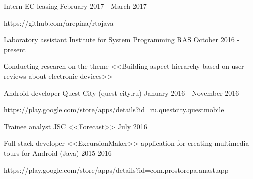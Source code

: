 



\begin{cventries}
	
\cventry
{Intern} %
{EC-leasing} %
{} %
{February 2017 - March 2017} %
{ 
	\begin{cvitems}
		\item {https://github.com/arepina/rtojava}
	\end{cvitems}
}



\cventry
{Laboratory assistant} %
{Institute for System Programming RAS} %
{} %
{October 2016 - present} %
{ 
	\begin{cvitems}
		\item {Сonducting research on the theme <<Building aspect hierarchy based on user reviews about electronic devices>>}
	\end{cvitems}
}


\cventry
{Android developer} %
{Quest City (quest-city.ru)} %
{} %
{January 2016 - November 2016} %
{ %
  \begin{cvitems}
\item {https://play.google.com/store/apps/details?id=ru.questcity.questmobile}
 \end{cvitems}
}


\cventrynodescription
{Trainee analyst } %
{JSC <<Forecast>>} %
{} %
{July 2016} %



\cventry
{Full-stack developer} %
{<<ExcursionMaker>> application for creating multimedia tours for Android  (Java) } %
{} %
{2015-2016} %
{ %
 \begin{cvitems}
\item {https://play.google.com/store/apps/details?id=com.prostorepa.anast.app}
 \end{cvitems}
}


\end{cventries}
